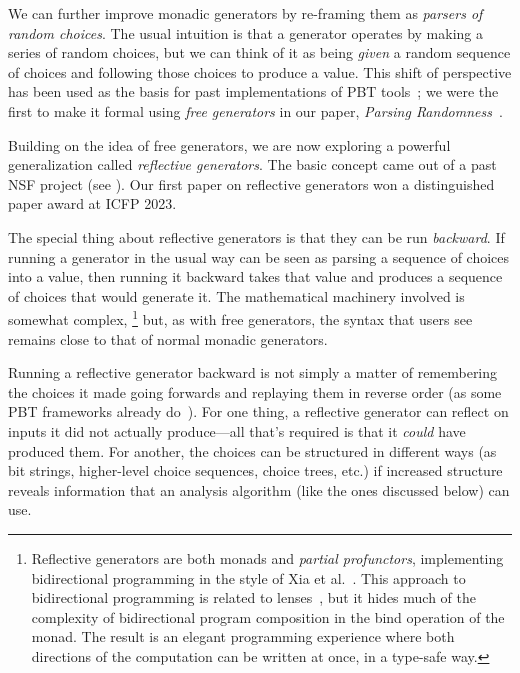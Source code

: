 We can further improve monadic generators by re-framing them as {\em
  parsers of random choices}. The usual intuition is that a generator
operates by making a series of random choices, but we can think of
it as being {\em given} a random sequence of choices and following
those choices to produce a value. This shift of perspective has been
used as the basis for past implementations of PBT
tools~\cite{maciver2019hypothesis, dolan2017testing}; we were the
first to make it
formal using {\em free generators}
in our paper, {\em Parsing Randomness}~\cite{goldstein2022parsing}.


 Building on the
idea of free generators, we are now exploring a powerful
generalization called {\em reflective
  generators}.  The basic concept came out of a
past NSF project (see ). Our first paper on
reflective generators won a distinguished paper award at ICFP 2023.

The special thing about reflective generators is that they can be run
{\em backward}.
If running a generator in the usual way can be seen as parsing a
sequence of choices into a
value, then running it backward takes that value and produces a
sequence of choices that
would generate it.
The mathematical machinery
involved is somewhat complex,%
\footnote{\normalsize Reflective generators are both monads and {\em
    partial profunctors},
implementing bidirectional programming in the style of Xia et
al.~\cite{xia2019composing}. This approach to bidirectional programming is
related to lenses~\cite{foster2009bidirectional}, but it hides much of the
complexity of bidirectional program composition in the bind operation of the
monad. The result is an elegant programming experience where both directions of
the computation can be written at once, in a type-safe way.}
but, as with free generators, the syntax that users see remains close to
that of normal monadic generators.

Running a reflective generator backward is not simply a matter of
remembering the choices it made going forwards and replaying them in
reverse order (as some PBT frameworks already do~\cite{maciver2019hypothesis,
  hatfield-dodds_hypofuzz_nodate}). For one thing, a reflective
generator can reflect on inputs it did not actually
produce---all that's required is that it {\em could} have produced
them.  For another, the choices can be structured in different ways (as bit
strings, higher-level choice sequences, choice trees, etc.) if increased
structure reveals information that an analysis algorithm (like the ones
discussed below) can use. \iflater{}\fi{}

